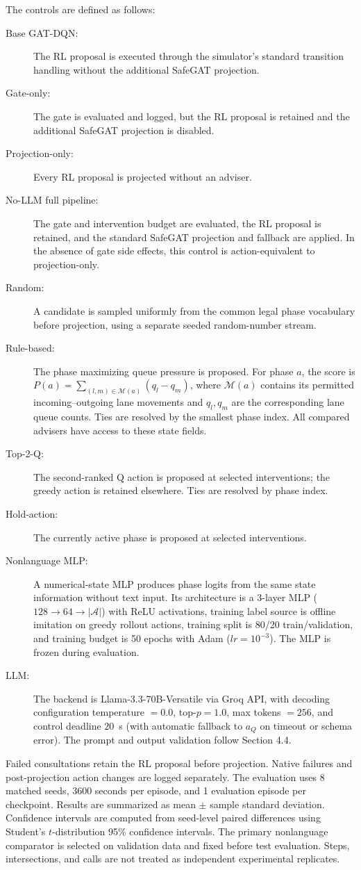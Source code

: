 \documentclass[10pt]{article}
\begin{document}
The controls are defined as follows:
\begin{description}
\item[Base GAT-DQN:] The RL proposal is executed through the simulator's
standard transition handling without the additional SafeGAT projection.
\item[Gate-only:] The gate is evaluated and logged, but the RL proposal is
retained and the additional SafeGAT projection is disabled.
\item[Projection-only:] Every RL proposal is projected without an adviser.
\item[No-LLM full pipeline:] The gate and intervention budget are evaluated,
the RL proposal is retained, and the standard SafeGAT projection and fallback
are applied. In the absence of gate side effects, this control is action-equivalent
to projection-only.
\item[Random:] A candidate is sampled uniformly from the common legal phase
vocabulary before projection, using a separate seeded random-number stream.
\item[Rule-based:] The phase maximizing queue pressure is proposed. For phase
$a$, the score is $P(a)=\sum_{(l,m)\in\mathcal M(a)}(q_l-q_m)$, where
$\mathcal M(a)$ contains its permitted incoming--outgoing lane movements and
$q_l,q_m$ are the corresponding lane queue counts. Ties are resolved by the
smallest phase index. All compared advisers have access to these state fields.
\item[Top-2-Q:] The second-ranked Q action is proposed at selected interventions;
the greedy action is retained elsewhere. Ties are resolved by phase index.
\item[Hold-action:] The currently active phase is proposed at selected interventions.
\item[Nonlanguage MLP:] A numerical-state MLP produces phase logits from the
same state information without text input. Its architecture is a 3-layer MLP ($128 \to 64 \to |\mathcal{A}|$)
with ReLU activations, training label source is offline imitation on greedy rollout actions,
training split is 80/20 train/validation, and training budget is 50 epochs with Adam ($lr=10^{-3}$).
The MLP is frozen during evaluation.
\item[LLM:] The backend is Llama-3.3-70B-Versatile via Groq API, with decoding configuration
temperature $=0.0$, top-$p=1.0$, max tokens $=256$, and control deadline $20$~s (with automatic
fallback to $a_Q$ on timeout or schema error). The prompt and output validation follow Section 4.4.
\end{description}
Failed consultations retain the RL proposal before projection. Native failures
and post-projection action changes are logged separately. The evaluation uses
8 matched seeds, 3600 seconds per episode, and 1 evaluation episode
per checkpoint. Results are summarized as mean $\pm$ sample standard deviation.
Confidence intervals are computed from seed-level paired differences using
Student's $t$-distribution 95\% confidence intervals. The primary nonlanguage comparator is selected on validation data and
fixed before test evaluation. Steps, intersections, and calls are not treated
as independent experimental replicates.
\end{document}
